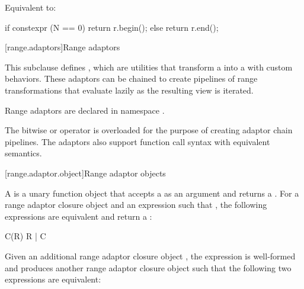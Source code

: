 {\begin{itemdescr}
\pnum
\effects Equivalent to:
\begin{codeblock}
if constexpr (N == 0)
  return r.begin();
else
  return r.end();
\end{codeblock}
\end{itemdescr}

[range.adaptors]{Range adaptors}

\pnum
This subclause defines , which are utilities that transform a
 into a  with custom behaviors. These
adaptors can be chained to create pipelines of range transformations that
evaluate lazily as the resulting view is iterated.

\pnum
Range adaptors are declared in namespace .

\pnum
The bitwise or operator is overloaded for the purpose of creating adaptor chain
pipelines. The adaptors also support function call syntax with equivalent
semantics.

\pnum
\begin{example}
\end{example}

[range.adaptor.object]{Range adaptor objects}

\pnum
A  is a unary function object that accepts
a  as an argument and returns a . For
a range adaptor closure object  and an expression  such that
   , the following
expressions are equivalent and return a :

\begin{codeblock}
C(R)
R | C
\end{codeblock}

Given an additional range adaptor closure object ,
the expression  is well-formed and produces another range adaptor
closure object such that the following two expressions are equivalent:

}
